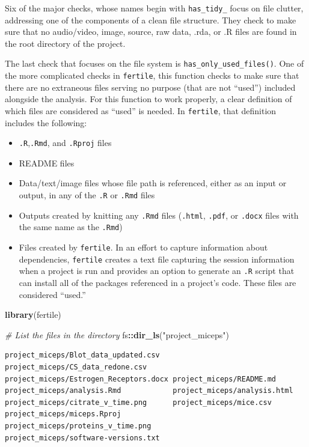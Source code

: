 \documentclass[12pt,twoside]{reedthesis}
\newenvironment{Shaded}{\begin{snugshade}}{\end{snugshade}}
\newcommand{\KeywordTok}[1]{\textcolor[rgb]{0.13,0.29,0.53}{\textbf{#1}}}
\newcommand{\StringTok}[1]{\textcolor[rgb]{0.31,0.60,0.02}{#1}}
\newcommand{\CommentTok}[1]{\textcolor[rgb]{0.56,0.35,0.01}{\textit{#1}}}
\newcommand{\OperatorTok}[1]{\textcolor[rgb]{0.81,0.36,0.00}{\textbf{#1}}}
\newcommand{\NormalTok}[1]{#1}
\providecommand{\tightlist}{%
  \setlength{\itemsep}{0pt}\setlength{\parskip}{0pt}}
\begin{document}
Six of the major checks, whose names begin with \texttt{has\_tidy\_}
focus on file clutter, addressing one of the components of a clean file
structure. They check to make sure that no audio/video, image, source,
raw data, .rda, or .R files are found in the root directory of the
project.

The last check that focuses on the file system is
\texttt{has\_only\_used\_files()}. One of the more complicated checks in
\texttt{fertile}, this function checks to make sure that there are no
extraneous files serving no purpose (that are not ``used'') included
alongside the analysis. For this function to work properly, a clear
definition of which files are considered as ``used'' is needed. In
\texttt{fertile}, that definition includes the following:
\begin{itemize}
\tightlist
\item
  \texttt{.R},\texttt{.Rmd}, and \texttt{.Rproj} files
\item
  README files
\item
  Data/text/image files whose file path is referenced, either as an
  input or output, in any of the \texttt{.R} or \texttt{.Rmd} files
\item
  Outputs created by knitting any \texttt{.Rmd} files (\texttt{.html},
  \texttt{.pdf}, or \texttt{.docx} files with the same name as the
  \texttt{.Rmd})
\item
  Files created by \texttt{fertile}. In an effort to capture information
  about dependencies, \texttt{fertile} creates a text file capturing the
  session information when a project is run and provides an option to
  generate an \texttt{.R} script that can install all of the packages
  referenced in a project's code. These files are considered ``used.''
\end{itemize}
\begin{Shaded}
\begin{Highlighting}[]
\KeywordTok{library}\NormalTok{(fertile)}
\end{Highlighting}
\end{Shaded}
\begin{Shaded}
\begin{Highlighting}[]
\CommentTok{# List the files in the directory}
\NormalTok{fs}\OperatorTok{::}\KeywordTok{dir_ls}\NormalTok{(}\StringTok{"project_miceps"}\NormalTok{)}
\end{Highlighting}
\end{Shaded}
\begin{verbatim}
project_miceps/Blot_data_updated.csv   project_miceps/CS_data_redone.csv      
project_miceps/Estrogen_Receptors.docx project_miceps/README.md               
project_miceps/analysis.Rmd            project_miceps/analysis.html           
project_miceps/citrate_v_time.png      project_miceps/mice.csv                
project_miceps/miceps.Rproj            project_miceps/proteins_v_time.png     
project_miceps/software-versions.txt   
\end{verbatim}
\end{document}
